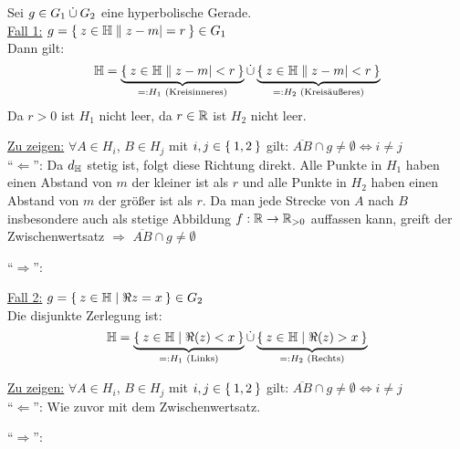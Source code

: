\documentclass[a5paper,oneside]{scrbook}
\begin{document}
\begin{beweis}\leavevmode
 Sei $g \in G_1 \mathbin{\dot{\cup}} G_2$ eine hyperbolische Gerade.\\
              \underline{Fall 1:} $g = \Set{z \in \ensuremath{\mathbb{H}}| |z-m| = r} \in G_1$\\
              Dann gilt:
              \[\mathbb{H} = \underbrace{\Set{z \in \ensuremath{\mathbb{H}}| |z-m| < r}}_{=:H_1 \text{ (Kreisinneres)}} \mathbin{\dot{\cup}} \underbrace{\Set{z \in \ensuremath{\mathbb{H}}| |z-m| < r}}_{=:H_2 \text{ (Kreisäußeres)}}\]
              Da $r > 0$ ist $H_1$ nicht leer, da $r \in \mathbb{R}$ ist $H_2$ nicht leer.

              \underline{Zu zeigen:} $\forall A \in H_i$, $B \in H_j$ mit
                      $i,j \in \Set{1,2}$ gilt:
                      $\overline{AB} \cap g \neq \emptyset \Leftrightarrow i \neq j$\\
              \enquote{$\Leftarrow$}: Da $d_{\mathbb{H}}$ stetig ist, folgt diese Richtung
              direkt. Alle Punkte in $H_1$ haben einen Abstand von $m$ der kleiner
              ist als $r$ und alle Punkte in $H_2$ haben einen Abstand von $m$ der
              größer ist als $r$. Da man jede Strecke von $A$ nach $B$ insbesondere
              auch als stetige Abbildung $f: \mathbb{R} \rightarrow \mathbb{R}_{>0}$ auffassen
              kann, greift der Zwischenwertsatz $\Rightarrow$ $\overline{AB} \cap g \neq \emptyset$

              \enquote{$\Rightarrow$}:

              \underline{Fall 2:} $g = \Set{z \in \ensuremath{\mathbb{H}}| \Re{z} = x} \in G_2$\\
              Die disjunkte Zerlegung ist:
              \[\mathbb{H} = \underbrace{\Set{z \in \ensuremath{\mathbb{H}}| \Re(z) < x}}_{=: H_1 \text{ (Links)}} \mathbin{\dot{\cup}} \underbrace{\Set{z \in \ensuremath{\mathbb{H}}| \Re(z) > x}}_{=: H_2 \text{ (Rechts)}}\]

              \underline{Zu zeigen:} $\forall A \in H_i$, $B \in H_j$ mit
                      $i,j \in \Set{1,2}$ gilt:
                      $\overline{AB} \cap g \neq \emptyset \Leftrightarrow i \neq j$\\
              \enquote{$\Leftarrow$}: Wie zuvor mit dem Zwischenwertsatz.

              \enquote{$\Rightarrow$}:
\end{beweis}
\end{document}
